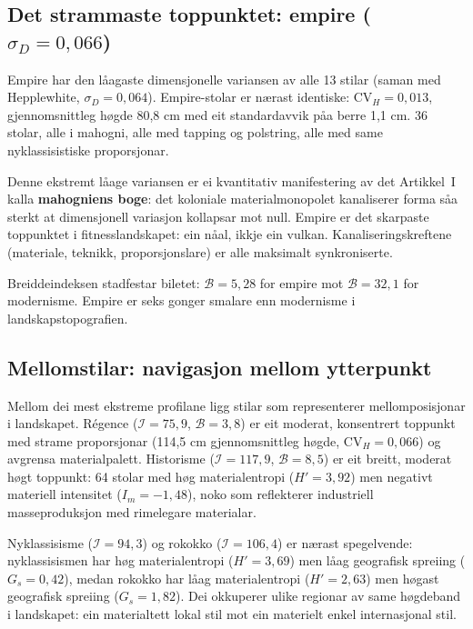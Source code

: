 \documentclass[10pt, a4paper, twocolumn]{article}
\begin{document}
\subsection{Det strammaste toppunktet: empire ($\sigma_D = 0{,}066$)}

Empire har den l\r{a}agaste dimensjonelle variansen av alle 13 stilar (saman med Hepplewhite, $\sigma_D = 0{,}064$). Empire-stolar er n\ae rast identiske: $\text{CV}_H = 0{,}013$, gjennomsnittleg h\o gde 80{,}8 cm med eit standardavvik p\r{a}a berre 1{,}1 cm. 36 stolar, alle i mahogni, alle med tapping og polstring, alle med same nyklassisistiske proporsjonar.

Denne ekstremt l\r{a}age variansen er ei kvantitativ manifestering av det Artikkel~I kalla \textbf{mahogniens boge}: det koloniale materialmonopolet kanaliserer forma s\r{a}a sterkt at dimensjonell variasjon kollapsar mot null. Empire er det skarpaste toppunktet i fitnesslandskapet: ein n\r{a}al, ikkje ein vulkan. Kanaliseringskreftene (materiale, teknikk, proporsjonslare) er alle maksimalt synkroniserte.

Breiddeindeksen stadfestar biletet: $\mathcal{B} = 5{,}28$ for empire mot $\mathcal{B} = 32{,}1$ for modernisme. Empire er seks gonger smalare enn modernisme i landskapstopografien.


\subsection{Mellomstilar: navigasjon mellom ytterpunkt}

Mellom dei mest ekstreme profilane ligg stilar som representerer mellomposisjonar i landskapet. R\'{e}gence ($\mathcal{I} = 75{,}9$, $\mathcal{B} = 3{,}8$) er eit moderat, konsentrert toppunkt med strame proporsjonar (114{,}5 cm gjennomsnittleg h\o gde, $\text{CV}_H = 0{,}066$) og avgrensa materialpalett. Historisme ($\mathcal{I} = 117{,}9$, $\mathcal{B} = 8{,}5$) er eit breitt, moderat h\o gt toppunkt: 64 stolar med h\o g materialentropi ($H' = 3{,}92$) men negativt materiell intensitet ($I_m = -1{,}48$), noko som reflekterer industriell masseproduksjon med rimelegare materialar.

Nyklassisisme ($\mathcal{I} = 94{,}3$) og rokokko ($\mathcal{I} = 106{,}4$) er n\ae rast spegelvende: nyklassisismen har h\o g materialentropi ($H' = 3{,}69$) men l\r{a}ag geografisk spreiing ($G_s = 0{,}42$), medan rokokko har l\r{a}ag materialentropi ($H' = 2{,}63$) men h\o gast geografisk spreiing ($G_s = 1{,}82$). Dei okkuperer ulike regionar av same h\o gdeband i landskapet: ein materialtett lokal stil mot ein materielt enkel internasjonal stil.
\end{document}
